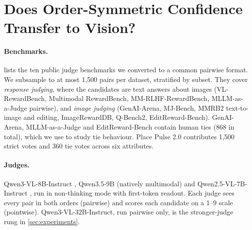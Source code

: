 \section{Does Order-Symmetric Confidence Transfer to Vision?}\label{sec:diagnostic}

\paragraph{Benchmarks.}
 lists the ten public judge benchmarks we converted to a common pairwise format. We subsample to at most 1{,}500 pairs per dataset, stratified by subset.
They cover \emph{response judging}, where the candidates are text answers about images (VL-RewardBench, Multimodal RewardBench, MM-RLHF-RewardBench, MLLM-as-a-Judge pairwise), and \emph{image judging} (GenAI-Arena, MJ-Bench, MMRB2 text-to-image and editing, ImageRewardDB, Q-Bench2, EditReward-Bench).
GenAI-Arena, MLLM-as-a-Judge and EditReward-Bench contain human ties (868 in total), which we use to study tie behaviour.
Place Pulse 2.0 contributes 1{,}500 strict votes and 360 tie votes across six attributes.

\paragraph{Judges.}
Qwen3-VL-8B-Instruct \citep{bai2025qwen3vl}, Qwen3.5-9B (natively multimodal) and Qwen2.5-VL-7B-Instruct \citep{bai2025qwen25vl}, run in non-thinking mode with first-token readout. Each judge sees every pair in both orders (pairwise) and scores each candidate on a 1--9 scale (pointwise). Qwen3-VL-32B-Instruct, run pairwise only, is the stronger-judge rung in \cref{sec:experiments}.

